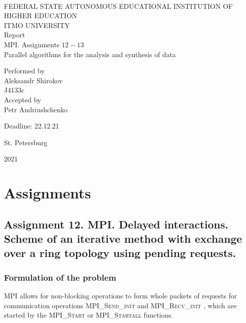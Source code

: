 \documentclass[%
12pt, %
final, %
oneside, %
onecolumn, %
centertags]{article} %
\theoremstyle{plain}
\theoremstyle{definition}
\theoremstyle{remark}
\begin{document}
	\begin{titlepage} 
		\begin{center}
		\textbf{}\\[2.0cm]
		\LARGE FEDERAL STATE AUTONOMOUS EDUCATIONAL INSTITUTION OF HIGHER EDUCATION \\[0.5cm]
		\Large ITMO UNIVERSITY \\[3cm]
		\LARGE Report\\
		\Large MPI. Assignments $12-13$ \\
		\Large Parallel algorithms for the analysis and synthesis of data \\[4cm]


		\begin{flushright}
		Performed by\\
		Aleksandr Shirokov\\
		J4133c\\
		Accepted by\\
		Petr Andriushchenko

		Deadline: 22.12.21
		\end{flushright}

		\vfill 

		{\Large {St. Petersburg}} \par
		{\Large {2021}}
		\end{center} 
	\end{titlepage}

\tableofcontents
\newpage


\section{Assignments}

\subsection{Assignment 12. MPI. Delayed interactions. Scheme of an iterative method 
with exchange over a ring topology using pending requests.}

\subsubsection{Formulation of the problem}

MPI allows for non-blocking operations to form whole packets of requests for communication operations \textsc{MPI\_Send\_init} and \textsc{MPI\_Recv\_init} , which are started by the \textsc{MPI\_Start} or \textsc{MPI\_Startall} functions.
\end{document}
